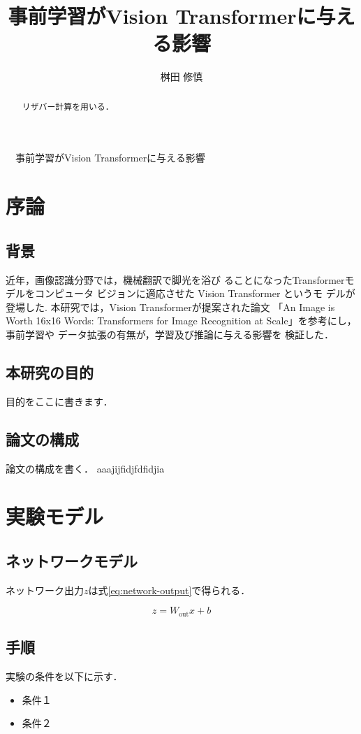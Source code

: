 \documentclass[a4paper, oneside, openany, dvipdfmx]{suribt}%
\title{事前学習がVision Transformerに与える影響}
\author{桝田 修慎}
\newcommand{\eref}[1]{式\eqref{#1}}
\begin{document}
\maketitle%
　事前学習がVision Transformerに与える影響

\frontmatter%
\begin{abstract}%
  リザバー計算\cite{jaeger2004harnessing,maass2002real}を用いる．
\end{abstract}

\tableofcontents%


\mainmatter%
\chapter{序論}
\section{背景}
近年，画像認識分野では，機械翻訳で脚光を浴び
ることになったTransformer\cite{dosovitskiy2021image}モデルをコンピュータ ビジョンに適応させた Vision Transformer というモ デルが登場した.
本研究では，Vision Transformerが提案された論文
「An Image is Worth 16x16 Words: Transformers for Image Recognition at Scale」を参考にし，事前学習や データ拡張の有無が，学習及び推論に与える影響を 検証した．
\section{本研究の目的}
目的をここに書きます．
\section{論文の構成}
論文の構成を書く．
aaajijfidjfdfidjia


\chapter{実験モデル}
\section{ネットワークモデル}
ネットワーク出力$z$は\eref{eq:network-output}で得られる．

\begin{equation}
  z = W_\mathrm{out} x + b
  \label{eq:network-output}
\end{equation}

\section{手順}
実験の条件を以下に示す．
\begin{itemize}
  \item 条件１
  \item 条件２
\end{itemize}
\end{document}
